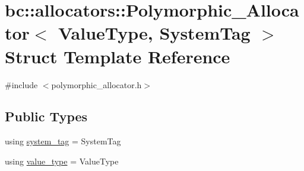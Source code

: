 \hypertarget{structbc_1_1allocators_1_1Polymorphic__Allocator}{}\section{bc\+:\+:allocators\+:\+:Polymorphic\+\_\+\+Allocator$<$ Value\+Type, System\+Tag $>$ Struct Template Reference}
\label{structbc_1_1allocators_1_1Polymorphic__Allocator}


{\ttfamily \#include $<$polymorphic\+\_\+allocator.\+h$>$}

\subsection*{Public Types}
\begin{DoxyCompactItemize}
\item 
using \hyperlink{structbc_1_1allocators_1_1Polymorphic__Allocator_a8036f2439226926f10176abbe9ef6f9d}{system\+\_\+tag} = System\+Tag
\item 
using \hyperlink{structbc_1_1allocators_1_1Polymorphic__Allocator_a2655c4bc3c86364c42aa20639a1b7a44}{value\+\_\+type} = Value\+Type
\end{DoxyCompactItemize}
